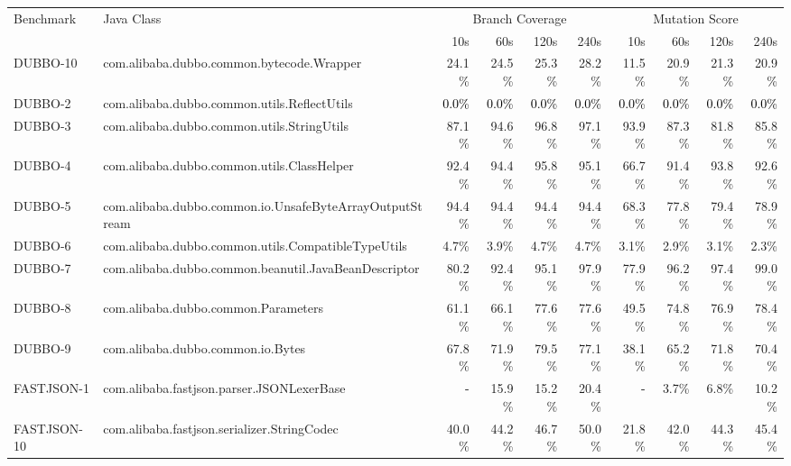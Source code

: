 \begin{tabular}{ ll rrrr rrrr}\toprule 
 \multirow{2}{1in}{Benchmark} & \multirow{2}{1in}{Java Class} &  \multicolumn{4}{c}{Branch Coverage} &  \multicolumn{4}{c}{Mutation Score}\\\cmidrule(lr){3-6}\cmidrule(lr){7-10} 
 & & 10s & 60s & 120s & 240s & 10s & 60s & 120s & 240s \\ 
\midrule 
DUBBO-10  &  com.alibaba.dubbo.common.bytecode.Wrapper & 24.1\% & 24.5\% & 25.3\% & 28.2\% & 11.5\% & 20.9\% & 21.3\% & 20.9\%\\ 
DUBBO-2  &  com.alibaba.dubbo.common.utils.ReflectUtils & \cellcolor{light-gray} \textcolor{black}{0.0\%} & \cellcolor{light-gray} \textcolor{black}{0.0\%} & \cellcolor{light-gray} \textcolor{black}{0.0\%} & \cellcolor{light-gray} \textcolor{black}{0.0\%} & \cellcolor{light-gray} \textcolor{black}{0.0\%} & \cellcolor{light-gray} \textcolor{black}{0.0\%} & \cellcolor{light-gray} \textcolor{black}{0.0\%} & \cellcolor{light-gray} \textcolor{black}{0.0\%}\\ 
DUBBO-3  &  com.alibaba.dubbo.common.utils.StringUtils & 87.1\% & 94.6\% & 96.8\% & 97.1\% & 93.9\% & 87.3\% & 81.8\% & 85.8\%\\ 
DUBBO-4  &  com.alibaba.dubbo.common.utils.ClassHelper & 92.4\% & 94.4\% & 95.8\% & 95.1\% & 66.7\% & 91.4\% & 93.8\% & 92.6\%\\ 
DUBBO-5  &  com.alibaba.dubbo.common.io.UnsafeByteArrayOutputStream & 94.4\% & 94.4\% & 94.4\% & 94.4\% & 68.3\% & 77.8\% & 79.4\% & 78.9\%\\ 
DUBBO-6  &  com.alibaba.dubbo.common.utils.CompatibleTypeUtils & 4.7\% & 3.9\% & 4.7\% & 4.7\% & 3.1\% & 2.9\% & 3.1\% & 2.3\%\\ 
DUBBO-7  &  com.alibaba.dubbo.common.beanutil.JavaBeanDescriptor & 80.2\% & 92.4\% & 95.1\% & 97.9\% & 77.9\% & 96.2\% & 97.4\% & 99.0\%\\ 
DUBBO-8  &  com.alibaba.dubbo.common.Parameters & 61.1\% & 66.1\% & 77.6\% & 77.6\% & 49.5\% & 74.8\% & 76.9\% & 78.4\%\\ 
DUBBO-9  &  com.alibaba.dubbo.common.io.Bytes & 67.8\% & 71.9\% & 79.5\% & 77.1\% & 38.1\% & 65.2\% & 71.8\% & 70.4\%\\ 
FASTJSON-1  &  com.alibaba.fastjson.parser.JSONLexerBase & \cellcolor{light-gray} \textcolor{black}{-} & 15.9\% & 15.2\% & 20.4\% & \cellcolor{light-gray} \textcolor{black}{-} & 3.7\% & 6.8\% & 10.2\%\\ 
FASTJSON-10  &  com.alibaba.fastjson.serializer.StringCodec & 40.0\% & 44.2\% & 46.7\% & 50.0\% & 21.8\% & 42.0\% & 44.3\% & 45.4\%\\ 

\end{tabular}
